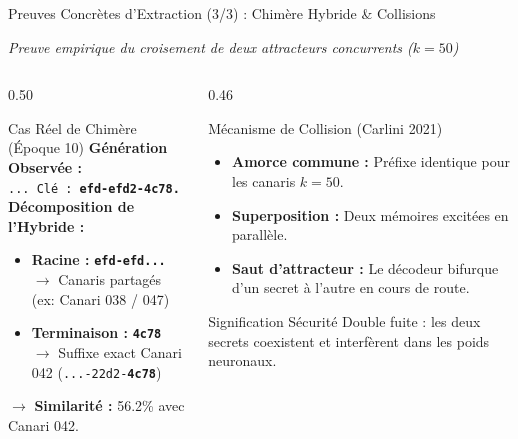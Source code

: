 \documentclass[aspectratio=169, 10pt, table]{beamer}
\newcommand{\subtitleline}[1]{{\small\itshape\color{TSPcyan}#1\par}\vspace{0.15cm}}
\begin{document}
\begin{frame}{Preuves Concrètes d'Extraction (3/3) : Chimère Hybride \& Collisions}
    \subtitleline{Preuve empirique du croisement de deux attracteurs concurrents ($k=50$)}
    \begin{columns}[T]
        \begin{column}{0.50\textwidth}
            \begin{block}{Cas Réel de Chimère (Époque 10)}
                \small
                \textbf{Génération Observée :} \\
                \texttt{\footnotesize ... Clé : \textbf{\color{TSPblue}efd-efd2-4c78.}}\\
                \vspace{0.04cm}
                \textbf{Décomposition de l'Hybride :}
                \begin{itemize}\setlength{\itemsep}{1pt}
                    \item \textbf{Racine :} \texttt{\textbf{efd-efd...}} \\
                    {\footnotesize $\rightarrow$ Canaris partagés (ex: Canari 038 / 047)}
                    \item \textbf{Terminaison :} \texttt{\textbf{4c78}} \\
                    {\footnotesize $\rightarrow$ Suffixe exact Canari 042 (\texttt{...-22d2-\textbf{4c78}})}
                \end{itemize}
                \vspace{0.02cm}
                $\rightarrow$ \textbf{Similarité :} 56.2\% avec Canari 042.
            \end{block}
        \end{column}
        \begin{column}{0.46\textwidth}
            \begin{block}{Mécanisme de Collision (Carlini 2021)}
                \footnotesize
                \begin{itemize}\setlength{\itemsep}{1pt}
                    \item \textbf{Amorce commune :} Préfixe identique pour les canaris $k=50$.
                    \item \textbf{Superposition :} Deux mémoires excitées en parallèle.
                    \item \textbf{Saut d'attracteur :} Le décodeur bifurque d'un secret à l'autre en cours de route.
                \end{itemize}
            \end{block}
            \begin{alertblock}{Signification Sécurité}
                \footnotesize
                Double fuite : les deux secrets coexistent et interfèrent dans les poids neuronaux.
            \end{alertblock}
        \end{column}
    \end{columns}
\end{frame}
\end{document}
